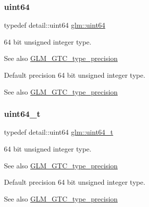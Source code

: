 \subsubsection{\texorpdfstring{uint64}{uint64}}
{\footnotesize\ttfamily typedef detail\+::uint64 \hyperlink{group__gtc__type__precision_gae3632bf9b37da66233d78930dd06378a}{glm\+::uint64}}

64 bit unsigned integer type. \begin{DoxySeeAlso}{See also}
\hyperlink{group__gtc__type__precision}{G\+L\+M\+\_\+\+G\+T\+C\+\_\+type\+\_\+precision}
\end{DoxySeeAlso}
Default precision 64 bit unsigned integer type. \begin{DoxySeeAlso}{See also}
\hyperlink{group__gtc__type__precision}{G\+L\+M\+\_\+\+G\+T\+C\+\_\+type\+\_\+precision} 
\end{DoxySeeAlso}
\mbox{\label{group__gtc__type__precision_ga058f57c19e1befdcf12498944bd73e69}} 
\subsubsection{\texorpdfstring{uint64\+\_\+t}{uint64\_t}}
{\footnotesize\ttfamily typedef detail\+::uint64 \hyperlink{group__gtc__type__precision_ga058f57c19e1befdcf12498944bd73e69}{glm\+::uint64\+\_\+t}}

64 bit unsigned integer type. \begin{DoxySeeAlso}{See also}
\hyperlink{group__gtc__type__precision}{G\+L\+M\+\_\+\+G\+T\+C\+\_\+type\+\_\+precision}
\end{DoxySeeAlso}
Default precision 64 bit unsigned integer type. \begin{DoxySeeAlso}{See also}
\hyperlink{group__gtc__type__precision}{G\+L\+M\+\_\+\+G\+T\+C\+\_\+type\+\_\+precision} 
\end{DoxySeeAlso}
\mbox{\label{group__gtc__type__precision_ga1a7dcd8aac97cc8020817c94049deff2}} 
